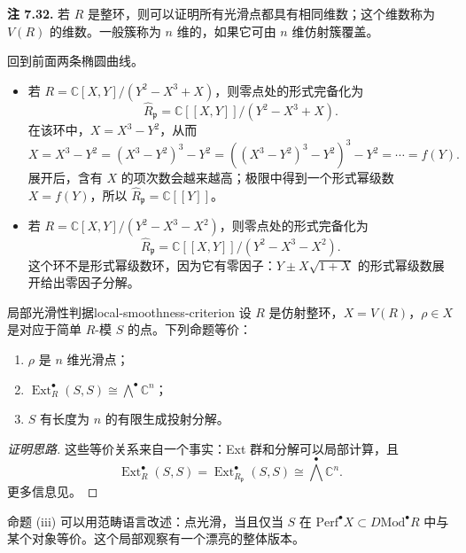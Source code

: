 \begin{note}\label{note:dimension-smooth-points}
\textbf{注 7.32.} 若 $R$ 是整环，则可以证明所有光滑点都具有相同维数；这个维数称为 $V(R)$ 的维数。一般簇称为 $n$ 维的，如果它可由 $n$ 维仿射簇覆盖。
\end{note}

\begin{example}[椭圆曲线的局部完备化]
回到前面两条椭圆曲线。
\begin{itemize}
  \item 若 $R=\mathbb C[X,Y]/(Y^2-X^3+X)$，则零点处的形式完备化为
  \[
    \widehat R_{\mathfrak p}=\mathbb C[[X,Y]]/(Y^2-X^3+X).
  \]
  在该环中，$X=X^3-Y^2$，从而
  \[
    X=X^3-Y^2=(X^3-Y^2)^3-Y^2
      =((X^3-Y^2)^3-Y^2)^3-Y^2=\cdots=f(Y).
  \]
  展开后，含有 $X$ 的项次数会越来越高；极限中得到一个形式幂级数 $X=f(Y)$，所以 $\widehat R_{\mathfrak p}=\mathbb C[[Y]]$。
  \item 若 $R=\mathbb C[X,Y]/(Y^2-X^3-X^2)$，则零点处的形式完备化为
  \[
    \widehat R_{\mathfrak p}=\mathbb C[[X,Y]]/(Y^2-X^3-X^2).
  \]
  这个环不是形式幂级数环，因为它有零因子：$Y\pm X\sqrt{1+X}$ 的形式幂级数展开给出零因子分解。
\end{itemize}
\end{example}

\begin{theorem}{局部光滑性判据}{local-smoothness-criterion}
设 $R$ 是仿射整环，$X=V(R)$，$\rho\in X$ 是对应于简单 $R$-模 $S$ 的点。下列命题等价：
\begin{enumerate}[label=(\roman*)]
  \item $\rho$ 是 $n$ 维光滑点；
  \item $\operatorname{Ext}^{\bullet}_R(S,S)\cong\bigwedge^{\bullet}\mathbb C^n$；
  \item $S$ 有长度为 $n$ 的有限生成投射分解。
\end{enumerate}
\end{theorem}
\begin{proof}[证明思路]
这些等价关系来自一个事实：Ext 群和分解可以局部计算，且
\[
  \operatorname{Ext}^{\bullet}_R(S,S)
  =\operatorname{Ext}^{\bullet}_{R_{\mathfrak p}}(S,S)
  \cong\bigwedge^{\bullet}\mathbb C^n.
\]
更多信息见。
\end{proof}

命题 (iii) 可以用范畴语言改述：点光滑，当且仅当 $S$ 在 $\mathrm{Perf}^{\bullet}X\subset D\mathrm{Mod}^{\bullet}R$ 中与某个对象等价。这个局部观察有一个漂亮的整体版本。

